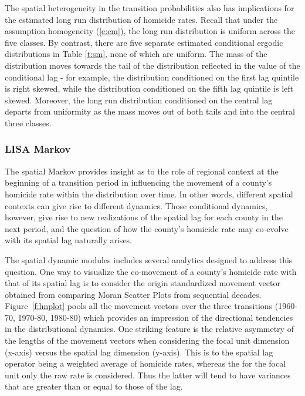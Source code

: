 \documentclass[11pt, titlepage]{article}
\begin{document}
The spatial heterogeneity in the transition probabilities also has
implications for the estimated long run distribution of homicide rates.
Recall that under the assumption homogeneity (\ref{e:cm}), the long run
distribution is uniform across the five classes. By contrast, there are
five separate estimated conditional ergodic distributions in Table
\ref{t:sm},
none of which are uniform. The mass of the distribution moves towards
the tail of the distribution reflected in the value of the conditional
lag - for example, the distribution conditioned on the first lag
quintile is right skewed, while the distribution conditioned on the
fifth lag quintile is left skewed. Moreover, the long run distribution
conditioned on the central lag departs from uniformity as the mass moves
out of both tails and into the central three classes.


\subsubsection{LISA Markov}
The spatial Markov provides insight as to the role of regional context
at the beginning of a transition period in influencing the movement of a
county's homicide rate within the distribution over time. In other
words, different spatial contexts can give rise to different dynamics.
Those conditional dynamics, however, give rise to new realizations of
the spatial lag for each county in the next period, and the question of
how the county's homicide rate may co-evolve with its spatial lag
naturally arises.

The spatial dynamic modules includes several analytics designed to
address this question. One way to visualize the co-movement of a
county's homicide rate with that of its spatial lag is to consider the
origin standardized movement vector obtained from comparing Moran
Scatter Plots \citep{Anselin:1996ze} from sequential decades.
Figure~\ref{f:lmplot} pools all the movement vectors over the three
transitions (1960-70, 1970-80, 1980-80) which  provides an impression of
the directional tendencies in the distributional dynamics. One striking
feature is the relative asymmetry of the lengths of the movement vectors
when considering the focal unit dimension (x-axis) versus the spatial lag
dimension (y-axis). This is to the spatial lag operator being a weighted
average of homicide rates, whereas the for the focal unit only the raw
rate is considered. Thus the latter will tend to have variances that are
greater than or equal to those of the lag.
\end{document}
